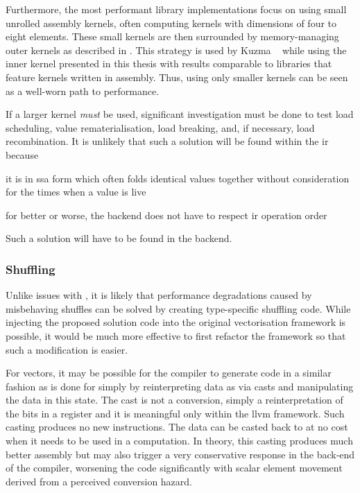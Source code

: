 \documentclass[\main/thesis.tex]{subfiles}
\begin{document}
Furthermore, the most performant library implementations focus on using small unrolled assembly kernels, often computing kernels with dimensions of four to eight elements.
These small kernels are then surrounded by memory-managing outer kernels as described in .
This strategy is used by Kuzma \etal~\autocite{kuzma2021fast} while using the inner kernel presented in this thesis with results comparable to libraries that feature kernels written in assembly.
Thus, using only smaller kernels can be seen as a well-worn path to performance.

If a larger kernel \emph{must} be used, significant investigation must be done to test load scheduling, value \gls{rematerialisation}, load breaking, and, if necessary, load recombination.
It is unlikely that such a solution will be found within the \gls{ir} because
\begin{enumerate*}[itemjoin={{; }}, itemjoin*={{; and }}, label=(\arabic*), after={.}]
  \item it is in \gls{ssa} form which often folds identical values together without consideration for the times when a value is \gls{live}
  \item for better or worse, the backend does not have to respect \gls{ir} operation order
\end{enumerate*}
Such a solution will have to be found in the backend.

\subsubsection{Shuffling}
Unlike issues with , it is likely that performance degradations caused by misbehaving shuffles can be solved by creating type-specific shuffling code.
While injecting the proposed solution code into the original vectorisation framework is possible, it would be much more effective to first refactor the framework so that such a modification is easier.

For  vectors, it may be possible for the compiler to generate code in a similar fashion as is done for  simply by reinterpreting data as  via casts and manipulating the data in this state.
The cast is not a conversion, simply a reinterpretation of the bits in a register and it is meaningful only within the \gls{llvm} framework.
Such casting produces no new instructions.
The data can be casted back to  at no cost when it needs to be used in a computation.
In theory, this casting produces much better assembly but may also trigger a very conservative response in the back-end of the compiler, worsening the code significantly with scalar element movement derived from a perceived conversion hazard.
\end{document}
